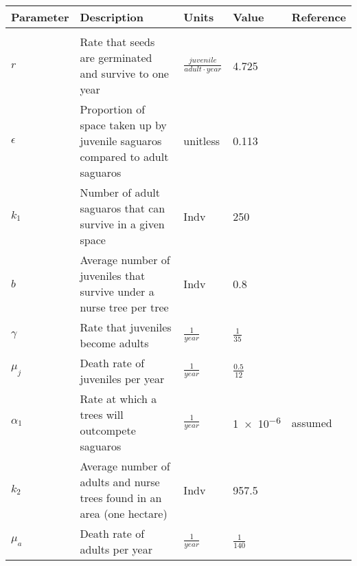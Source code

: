  \label{table:1} 
\begin{longtable}{m{1cm} m{6cm} m{1.5cm} m{1cm} m{1.3cm}}
\hline
\textbf{Parameter} &\textbf{Description} & \textbf{Units} & \textbf{Value} & \textbf{Reference}\\
\hline
\hline\\
\rule{0pt}{.7cm}$r$ & Rate that seeds are germinated and survive to one year & $\displaystyle\frac{juvenile}{adult\cdot year}$ & 4.725 & \cite{saguaroInformative, steenbergh1977ecology, EcofSaguaro}\\

\rule{0pt}{.7cm}$\epsilon$ & Proportion of space taken up by juvenile saguaros compared to adult saguaros & unitless & 0.113 & \cite{Drezner2014,NPSsaguaroRoots}\\

\rule{0pt}{.7cm}$k_1$ & Number of adult saguaros that can survive in a given space & Indv & 250 & \cite{A-SdesertMuseum}\\

\rule{0pt}{.7cm}$b$ & Average number of juveniles that survive under a nurse tree per tree & Indv & 0.8 & \cite{Bashan2009}\\

\rule{0pt}{.7cm}$\gamma$ & Rate that juveniles become adults & $\displaystyle\frac{1}{year}$ & $\displaystyle\frac{1}{35}$ & \cite{SaguaroGrowth} \\

\rule{0pt}{.7cm}$\mu_j$ & Death rate of juveniles per year & $\displaystyle\frac{1}{year}$ & $\displaystyle\frac{0.5}{12}$ & \cite{Orum}\\

\rule{0pt}{.7cm}$\alpha_1$ & Rate at which a trees will outcompete saguaros & $\displaystyle\frac{1}{year}$ & \num{1e-6} & assumed\\

\rule{0pt}{.7cm}$k_2$ & Average number of adults and nurse trees found in an area (one hectare) & Indv &  957.5 & \cite{A-SdesertMuseum,paloVerdeFacts} \\

\rule{0pt}{.7cm}$\mu_a$ & Death rate of adults per year & $\displaystyle\frac{1}{year}$ & $\displaystyle\frac{1}{140}$ & \cite{SaguaroGrowth}\\


\end{longtable}
